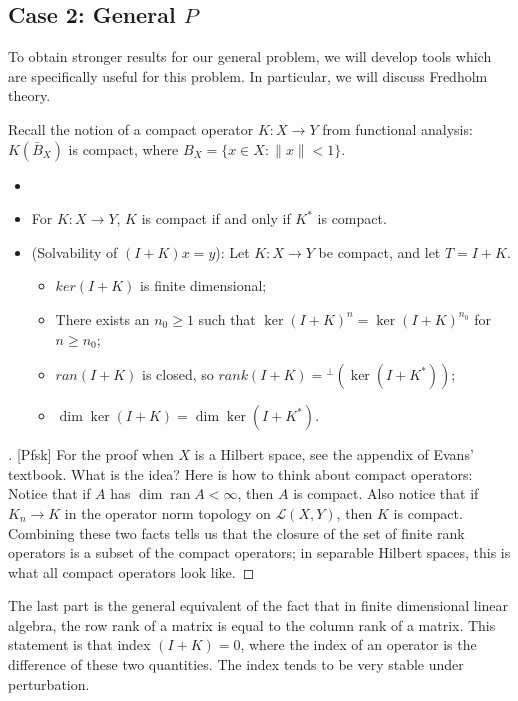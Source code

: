 \subsection{Case 2: General $P$}

To obtain stronger results for our general problem, we will develop tools which are specifically useful for this problem. In particular, we will discuss Fredholm theory.

Recall the notion of a compact operator $K: X \rightarrow Y$ from functional analysis: $K\left(\bar{B}_{X}\right)$ is compact, where $B_{X}=\{x \in X:\|x\|<1\}$.

\begin{lemma}
\label{lem: Solvability with compact operator}
\begin{itemize}
    \item []
    \item For $K:X\to Y$, $K$ is compact if and only if $K^*$ is compact. 
    \item (Solvability of $(I+K)x=y$): Let $K:X\to Y$ be compact, and let $T=I+K$. 
    \begin{itemize}
        \item $ker(I+K)$ is finite dimensional;
        \item There exists an $n_0\ge 1$ such that $\ker(I+K)^n = \ker(I+K)^{n_0}$ for $n\ge n_0$; 
        \item $ran(I+K)$ is closed, so $rank(I+K) = {}^{\perp} (\ker(I+K^*))$;
        \item $\dim \ker(I+K) = \dim \ker(I+K^*)$. 
    \end{itemize}
\end{itemize}
\end{lemma}
\begin{proof}[][Pfsk]
     For the proof when $X$ is a Hilbert space, see the appendix of Evans' textbook. What is the idea? Here is how to think about compact operators: Notice that if $A$ has $\operatorname{dim} \operatorname{ran} A<\infty$, then $A$ is compact. Also notice that if $K_{n} \rightarrow K$ in the operator norm topology on $\mathcal{L}(X, Y)$, then $K$ is compact. Combining these two facts tells us that the closure of the set of finite rank operators is a subset of the compact operators; in separable Hilbert spaces, this is what all compact operators look like.
\end{proof}
\begin{remark}
    The last part is the general equivalent of the fact that in finite dimensional linear algebra, the row rank of a matrix is equal to the column rank of a matrix. This statement is that index $(I+K)=0$, where the index of an operator is the difference of these two quantities. The index tends to be very stable under perturbation.
\end{remark}

